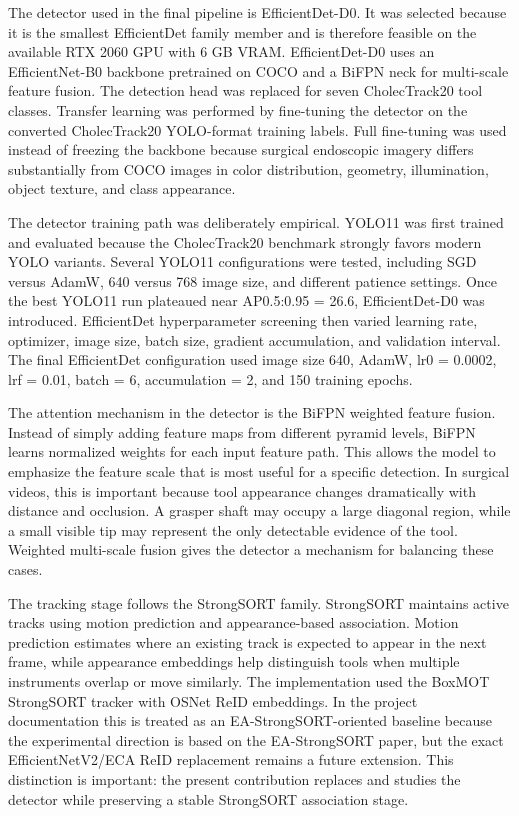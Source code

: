 \documentclass[12pt,a4paper]{article}
\begin{document}
The detector used in the final pipeline is EfficientDet-D0. It was selected because it is the smallest EfficientDet family member and is therefore feasible on the available RTX 2060 GPU with 6 GB VRAM. EfficientDet-D0 uses an EfficientNet-B0 backbone pretrained on COCO and a BiFPN neck for multi-scale feature fusion. The detection head was replaced for seven CholecTrack20 tool classes. Transfer learning was performed by fine-tuning the detector on the converted CholecTrack20 YOLO-format training labels. Full fine-tuning was used instead of freezing the backbone because surgical endoscopic imagery differs substantially from COCO images in color distribution, geometry, illumination, object texture, and class appearance.

The detector training path was deliberately empirical. YOLO11 was first trained and evaluated because the CholecTrack20 benchmark strongly favors modern YOLO variants. Several YOLO11 configurations were tested, including SGD versus AdamW, 640 versus 768 image size, and different patience settings. Once the best YOLO11 run plateaued near AP0.5:0.95 = 26.6, EfficientDet-D0 was introduced. EfficientDet hyperparameter screening then varied learning rate, optimizer, image size, batch size, gradient accumulation, and validation interval. The final EfficientDet configuration used image size 640, AdamW, lr0 = 0.0002, lrf = 0.01, batch = 6, accumulation = 2, and 150 training epochs.

The attention mechanism in the detector is the BiFPN weighted feature fusion. Instead of simply adding feature maps from different pyramid levels, BiFPN learns normalized weights for each input feature path. This allows the model to emphasize the feature scale that is most useful for a specific detection. In surgical videos, this is important because tool appearance changes dramatically with distance and occlusion. A grasper shaft may occupy a large diagonal region, while a small visible tip may represent the only detectable evidence of the tool. Weighted multi-scale fusion gives the detector a mechanism for balancing these cases.

The tracking stage follows the StrongSORT family. StrongSORT maintains active tracks using motion prediction and appearance-based association. Motion prediction estimates where an existing track is expected to appear in the next frame, while appearance embeddings help distinguish tools when multiple instruments overlap or move similarly. The implementation used the BoxMOT StrongSORT tracker with OSNet ReID embeddings. In the project documentation this is treated as an EA-StrongSORT-oriented baseline because the experimental direction is based on the EA-StrongSORT paper, but the exact EfficientNetV2/ECA ReID replacement remains a future extension. This distinction is important: the present contribution replaces and studies the detector while preserving a stable StrongSORT association stage.
\end{document}
